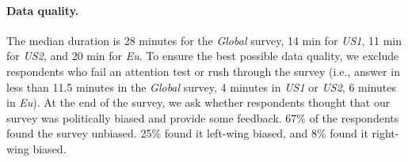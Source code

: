 \begin{small}
\paragraph{\small Data quality.} %
The median duration is 28 minutes for the \textit{Global} survey, 14 min for \textit{US1}, 11 min for \textit{US2}, and 20 min for \textit{Eu}. To ensure the best possible data quality, we exclude respondents who fail an attention test or rush through the survey (i.e., answer in less than 11.5 minutes in the \textit{Global} survey, 4 minutes in \textit{US1} or \textit{US2}, 6 minutes in \textit{Eu}). %
At the end of the survey, we ask whether respondents thought that our survey was politically biased and provide some feedback. 67\% of the respondents found the survey unbiased. 25\% found it left-wing biased, and 8\% found it right-wing biased.




\end{small}
